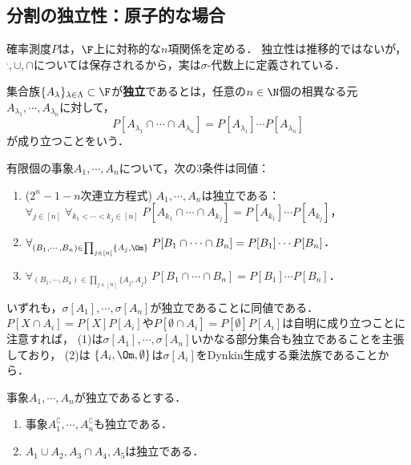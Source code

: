 \documentclass[uplatex,dvipdfmx]{jsreport}
\begin{document}
\subsection{分割の独立性：原子的な場合}

\begin{tcolorbox}[colframe=ForestGreen, colback=ForestGreen!10!white,breakable,colbacktitle=ForestGreen!40!white,coltitle=black,fonttitle=\bfseries\sffamily,
title=]
    確率測度$P$は，$\F$上に対称的な$n$項関係を定める．
    独立性は推移的ではないが，${}^\comp,\cup,\cap$については保存されるから，実は$\sigma$-代数上に定義されている．
\end{tcolorbox}

\begin{definition}[independent]
    集合族$\{A_\lambda\}_{\lambda\in\Lambda}\subset\F$が\textbf{独立}であるとは，任意の$n\in\N$個の相異なる元$A_{\lambda_1},\cdots,A_{\lambda_n}$に対して，
    \[P[A_{\lambda_1}\cap\cdots\cap A_{\lambda_n}]=P[A_{\lambda_1}]\cdots P[A_{\lambda_n}]\]
    が成り立つことをいう．
\end{definition}

\begin{proposition}[事象の独立性の特徴付け]
    有限個の事象$A_1,\cdots,A_n$について，次の3条件は同値：
    \begin{enumerate}
        \item ($2^n-1-n$次連立方程式) $A_1,\cdots,A_n$は独立である：$\forall_{j\in[n]}\;\forall_{k_1<\cdots<k_j\in[n]}\;P[A_{k_1}\cap\cdots\cap A_{k_j}]=P[A_{k_1}]\cdots P[A_{k_j}]$，
        \item $\forall_{(B_1,\cdots,B_n)\in\prod_{j\in[n]}\{A_j,\Om\}}\;P[B_1\cap\cdots\cap B_n]=P[B_1]\cdots P[B_n]$．
        \item $\forall_{(B_1,\cdots,B_n)\in\prod_{j\in[n]}\{A_j,A_j^\comp\}}\;P[B_1\cap\cdots\cap B_n]=P[B_1]\cdots P[B_n]$．
    \end{enumerate}
\end{proposition}
\begin{Proof}
    いずれも，$\sigma[A_1],\cdots,\sigma[A_n]$が独立であることに同値である．
    $P[X\cap A_i]=P[X]P[A_i]$や$P[\emptyset\cap A_i]=P[\emptyset]P[A_i]$は自明に成り立つことに注意すれば，
    (1)は$\sigma[A_1],\cdots,\sigma[A_n]$いかなる部分集合も独立であることを主張しており，
    (2)は
    $\{A_i,\Om,\emptyset\}$は$\sigma[A_i]$をDynkin生成する乗法族であることから．
\end{Proof}

\begin{lemma}[独立性の遺伝]
    事象$A_1,\cdots,A_n$が独立であるとする．
    \begin{enumerate}
        \item 事象$A_1^\complement,\cdots,A_n^\complement$も独立である．
        \item $A_1\cup A_2, A_3\cap A_4,A_5$は独立である．
    \end{enumerate}
\end{lemma}
\end{document}

